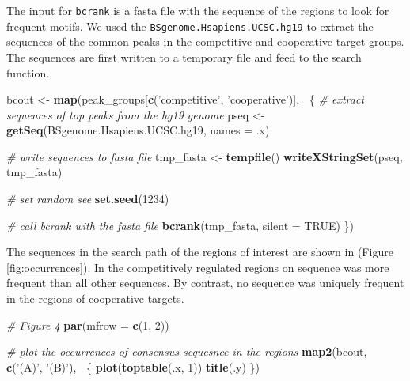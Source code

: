 \documentclass[9pt,a4paper,]{extarticle}
\newenvironment{Shaded}{\begin{snugshade}}{\end{snugshade}}
\newcommand{\CommentTok}[1]{\textcolor[rgb]{0.56,0.35,0.01}{\textit{#1}}}
\newcommand{\DataTypeTok}[1]{\textcolor[rgb]{0.13,0.29,0.53}{#1}}
\newcommand{\DecValTok}[1]{\textcolor[rgb]{0.00,0.00,0.81}{#1}}
\newcommand{\KeywordTok}[1]{\textcolor[rgb]{0.13,0.29,0.53}{\textbf{#1}}}
\newcommand{\NormalTok}[1]{#1}
\newcommand{\OperatorTok}[1]{\textcolor[rgb]{0.81,0.36,0.00}{\textbf{#1}}}
\newcommand{\OtherTok}[1]{\textcolor[rgb]{0.56,0.35,0.01}{#1}}
\newcommand{\StringTok}[1]{\textcolor[rgb]{0.31,0.60,0.02}{#1}}
\begin{document}
The input for \texttt{bcrank} is a fasta file with the sequence of the regions to look for frequent motifs. We used the \texttt{BSgenome.Hsapiens.UCSC.hg19} to extract the sequences of the common peaks in the competitive and cooperative target groups. The sequences are first written to a temporary file and feed to the search function.

\begin{Shaded}
\begin{Highlighting}[]
\NormalTok{bcout <-}\StringTok{ }\KeywordTok{map}\NormalTok{(peak_groups[}\KeywordTok{c}\NormalTok{(}\StringTok{'competitive'}\NormalTok{, }\StringTok{'cooperative'}\NormalTok{)], }\OperatorTok{~}\NormalTok{\{}
    \CommentTok{# extract sequences of top peaks from the hg19 genome}
\NormalTok{    pseq <-}\StringTok{ }\KeywordTok{getSeq}\NormalTok{(BSgenome.Hsapiens.UCSC.hg19, }\DataTypeTok{names =}\NormalTok{ .x)}
                 
    \CommentTok{# write sequences to fasta file}
\NormalTok{    tmp_fasta <-}\StringTok{ }\KeywordTok{tempfile}\NormalTok{()}
    \KeywordTok{writeXStringSet}\NormalTok{(pseq, tmp_fasta)}
                 
    \CommentTok{# set random see}
    \KeywordTok{set.seed}\NormalTok{(}\DecValTok{1234}\NormalTok{)}
                  
    \CommentTok{# call bcrank with the fasta file}
    \KeywordTok{bcrank}\NormalTok{(tmp_fasta, }\DataTypeTok{silent =} \OtherTok{TRUE}\NormalTok{)}
\NormalTok{\})}
\end{Highlighting}
\end{Shaded}

The sequences in the search path of the regions of interest are shown in (Figure \ref{fig:occurrences}). In the competitively regulated regions on sequence was more frequent than all other sequences. By contrast, no sequence was uniquely frequent in the regions of cooperative targets.

\begin{Shaded}
\begin{Highlighting}[]
\CommentTok{# Figure 4}
\KeywordTok{par}\NormalTok{(}\DataTypeTok{mfrow =} \KeywordTok{c}\NormalTok{(}\DecValTok{1}\NormalTok{, }\DecValTok{2}\NormalTok{))}

\CommentTok{# plot the occurrences of consensus sequesnce in the regions}
\KeywordTok{map2}\NormalTok{(bcout, }\KeywordTok{c}\NormalTok{(}\StringTok{'(A)'}\NormalTok{, }\StringTok{'(B)'}\NormalTok{), }\OperatorTok{~}\NormalTok{\{}
    \KeywordTok{plot}\NormalTok{(}\KeywordTok{toptable}\NormalTok{(.x, }\DecValTok{1}\NormalTok{))}
    \KeywordTok{title}\NormalTok{(.y)}
\NormalTok{\})}
\end{Highlighting}
\end{Shaded}
\end{document}
